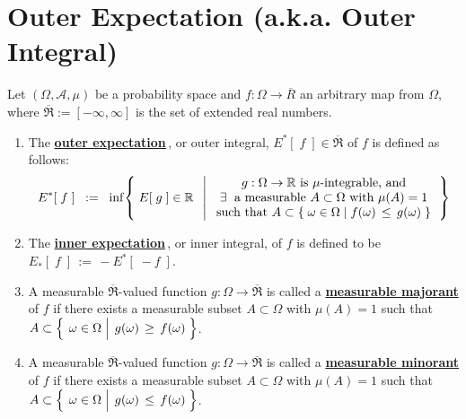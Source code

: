

\section{Outer Expectation (a.k.a. Outer Integral)}
\setcounter{theorem}{0}
\setcounter{equation}{0}

\renewcommand{\theenumi}{\roman{enumi}}
\renewcommand{\labelenumi}{\textnormal{(\theenumi)}$\;\;$}


\begin{definition}
\label{defn:OuterExpectation}
\mbox{}\vskip 0.1cm
\noindent
Let $(\Omega,\mathcal{A},\mu)$ be a probability space and
$f : \Omega \longrightarrow \overline{R}$
an arbitrary map from $\Omega$, where $\overline{\Re} := [-\infty,\infty]$ is the set of extended real numbers.
\begin{enumerate}
\item
	The \underline{\textbf{outer expectation}}\,, or outer integral,
	$E^{*}\!\left[\;f\;\right] \in \overline{\Re}$
	of $f$ is defined as follows:
	\begin{equation*}
	E^{*}\!\left[\;f\;\right]
	\;\; := \;\;
		\inf\!\left\{\;
			E\!\left[\;g\;\right] \in \Re
			\;\;\left\vert\;
			\begin{array}{c}
				\textnormal{$g:\Omega\rightarrow\Re$ is $\mu$-integrable, and}
				\\
				\textnormal{$\exists$\; a measurable $A \subset \Omega$ with $\mu(A) = 1$}
				\\
				\textnormal{such that $A \subset \{\;\omega\in\Omega\;\vert\;f(\omega) \,\leq\, g(\omega)\;\}$}
			\end{array}
			\right.
			\right\}
	\end{equation*}
\item
	The \underline{\textbf{inner expectation}}\,, or inner integral,
	of $f$ is defined to be
	$E_{*}\!\left[\;f\;\right] \, := \, - E^{*}\!\left[\;- f\;\right]$.
\item
	A measurable $\overline{\Re}$-valued function $g : \Omega\longrightarrow\overline{\Re}$
	is called a \underline{\textbf{measurable majorant}} of $f$ if there exists a measurable
	subset $A \subset \Omega$ with $\mu(A) = 1$ such that
	$A \subset \left\{\;\left.\omega\overset{{\color{white}.}}{\in}\Omega\;\right\vert\; g(\omega) \,\geq\, f(\omega)\;\right\}$.
\item
	A measurable $\overline{\Re}$-valued function $g : \Omega\longrightarrow\overline{\Re}$
	is called a \underline{\textbf{measurable minorant}} of $f$ if there exists a measurable
	subset $A \subset \Omega$ with $\mu(A) = 1$ such that
	$A \subset \left\{\;\left.\omega\overset{{\color{white}.}}{\in}\Omega\;\right\vert\; g(\omega) \,\leq\, f(\omega)\;\right\}$.
\end{enumerate}
\end{definition}

